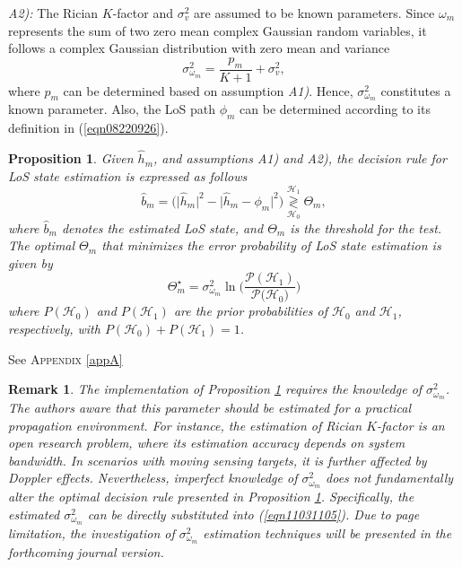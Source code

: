\documentclass[conference, a4paper]{IEEEtran}
\newtheorem{prop}{Proposition}
\newtheorem{rmk}{Remark}
\newcommand{\appref}[1]{\textsc{Appendix} \ref{#1}}
\renewcommand{\eqref}[1]{(\ref{#1})}
\newcommand{\propref}[1]{{\it Proposition \ref{#1}}}
\begin{document}
\textit{A2):} The Rician $K$-factor and $\sigma_{v}^{2}$ are assumed to be known parameters.
Since $\omega_{m}$ represents the sum of two zero mean complex Gaussian random variables, it follows a complex Gaussian distribution with zero mean and variance
\begin{equation} \label{eqn08300925}
	\sigma_{\omega_{m}}^{2} = \dfrac{p_{m}}{K + 1}  + \sigma_{v}^{2},
\end{equation}
where $p_{m}$ can be determined based on assumption \textit{A1)}.
Hence, $\sigma_{\omega_{m}}^{2}$ constitutes a known parameter.
Also, the LoS path $\phi_{m}$ can be determined according to its definition in \eqref{eqn08220926}.

\begin{prop} \label{prop01}
	Given $\hat{h}_{m}$, and assumptions \textit{A1)} and \textit{A2)}, the decision rule for LoS state estimation is expressed as follows
	\begin{equation} \label{eqn05260925}
		\hat{b}_{m} =\Big(\big|\hat{h}_{m}\big|^{2} - \big|\hat{h}_{m} - \phi_{m}\big|^{2}\Big) \underset{\mathcal{H}_{0}}{\overset{\mathcal{H}_{1}}{\gtrless}} \Theta_{m},
	\end{equation}
	where $\hat{b}_{m}$ denotes the estimated LoS state, and $\Theta_{m}$ is the threshold for the test.
	The optimal $\Theta_{m}$ that minimizes the error probability of LoS state estimation is given by
	\begin{equation}\label{eqn11031105}
		\Theta_{m}^{\star} = \sigma_{\omega_{m}}^{2} \ln\bigg(\frac{\mathcal{P}{(\mathcal{H}_{1})}}{\mathcal{P}{(\mathcal{H}_{0}\big)}}\bigg)
	\end{equation}
	where $P(\mathcal{H}_{0})$ and $P(\mathcal{H}_{1})$ are the prior probabilities of $\mathcal{H}_{0}$ and $\mathcal{H}_{1}$, respectively, with $P(\mathcal{H}_{0}) + P(\mathcal{H}_{1}) =1$.
\end{prop}

\begin{IEEEproof}
	See \appref{appA}
\end{IEEEproof}

\begin{rmk} \label{rmk01}
	The implementation of \propref{prop01} requires the knowledge of $\sigma_{\omega_{m}}^{2}$.
	The authors aware that this parameter should be estimated for a practical propagation environment.
	For instance, the estimation of Rician $K$-factor is an open research problem, where its estimation accuracy depends on system bandwidth.
	In scenarios with moving sensing targets, it is further affected by Doppler effects.
	Nevertheless, imperfect knowledge of $\sigma_{\omega_{m}}^{2}$ does not fundamentally alter the optimal decision rule presented in \propref{prop01}.
	Specifically, the estimated $\sigma_{\omega_{m}}^{2}$ can be directly substituted into \eqref{eqn11031105}.
	Due to page limitation, the investigation of $\sigma_{\omega_{m}}^{2}$ estimation techniques will be presented in the forthcoming journal version.
\end{rmk}
\end{document}
